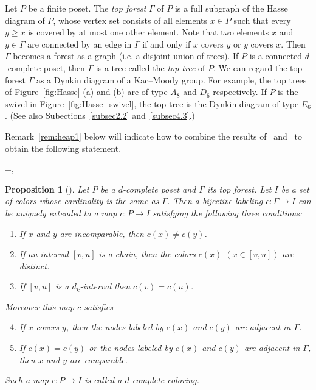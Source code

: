 \documentclass[10pt]{amsart}
\newtheorem{prop}[theo]{Proposition}
\theoremstyle{definition}
\theoremstyle{remark}
\begin{document}
Let $P$ be a finite poset.
The \emph{top forest} $\Gamma$ of $P$ is a full subgraph of 
the Hasse diagram of $P$, whose vertex set consists of all elements $x \in P$ 
such that every $y \ge x$ is covered by at most one other element. 
Note that two elements $x$ and $y \in \Gamma$ are connected by an edge in $\Gamma$ 
if and only if $x$ covers $y$ or $y$ covers $x$.
Then $\Gamma$ becomes a forest as a graph (i.e. a disjoint union of trees).
If $P$ is a connected $d$-complete poset, then $\Gamma$ is a tree called 
the \emph{top tree} of $P$.
We can regard the top forest $\Gamma$ as a Dynkin diagram of a Kac--Moody group.
For example, the top trees of Figure~\ref{fig:Hasse} (a) and (b) are
of type $A_8$ and $D_6$ respectively. 
If $P$ is the swivel in Figure~\ref{fig:Hasse_swivel}, the top tree is
the Dynkin diagram of type $E_6$.
(See also Subections~\ref{subsec2.2} and~\ref{subsec4.3}.)

Remark~\ref{rem:heap1} below will indicate how to combine the results 
of~\cite{Proc2} and~\cite{Stem2} to obtain the following statement.

\setbox\toto=\hbox{\cite[Proposition~8.6]{Proc2},~\cite[Proposition~3.1]{Stem2}}
\begin{prop}[\box\toto]
\label{prop:dc_color}
Let $P$ be a $d$-complete poset and $\Gamma$ its top forest.
Let $I$ be a set of colors whose cardinality is the same as $\Gamma$.
Then a bijective labeling $c : \Gamma \to I$ can be uniquely extended to a map 
$c : P \to I$ satisfying the following three conditions:
\begin{enumerate}[(C1)]
\item\label{prop2.5_C1} %
If $x$ and $y$ are incomparable, then $c(x) \neq c(y)$.
\item\label{prop2.5_C2} %
If an interval $[v,u]$ is a chain, then the colors $c(x)$ $(x \in [v,u])$ are 
distinct.
\item\label{prop2.5_C3} %
If $[v,u]$ is a $d_k$-interval then $c(v) = c(u)$.
\end{enumerate}
Moreover this map $c$ satisfies
\begin{enumerate}[(C1)]\setcounter{enumi}{3}
\item\label{prop2.5_C4} %
If $x$ covers $y$, then the nodes labeled by $c(x)$ and $c(y)$ are adjacent in $\Gamma$.
\item\label{prop2.5_C5} %
If $c(x) = c(y)$ or the nodes labeled by $c(x)$ and $c(y)$ are adjacent in $\Gamma$, 
then $x$ and $y$ are comparable.
\end{enumerate}
Such a map $c : P \to I$ is called a \emph{$d$-complete coloring}.
\end{prop}
\end{document}
